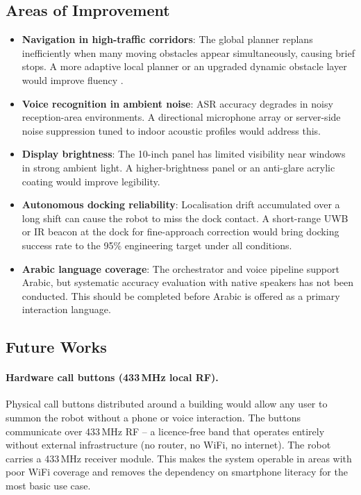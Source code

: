 \subsection{Areas of Improvement}

\begin{itemize}
  \item \textbf{Navigation in high-traffic corridors}: The global planner replans inefficiently when many moving obstacles appear simultaneously, causing brief stops. A more adaptive local planner or an upgraded dynamic obstacle layer would improve fluency \cite{chen2022}.
  \item \textbf{Voice recognition in ambient noise}: ASR accuracy degrades in noisy reception-area environments. A directional microphone array or server-side noise suppression tuned to indoor acoustic profiles would address this.
  \item \textbf{Display brightness}: The 10-inch panel has limited visibility near windows in strong ambient light. A higher-brightness panel or an anti-glare acrylic coating would improve legibility.
  \item \textbf{Autonomous docking reliability}: Localisation drift accumulated over a long shift can cause the robot to miss the dock contact. A short-range UWB or IR beacon at the dock for fine-approach correction would bring docking success rate to the 95\% engineering target under all conditions.
  \item \textbf{Arabic language coverage}: The orchestrator and voice pipeline support Arabic, but systematic accuracy evaluation with native speakers has not been conducted. This should be completed before Arabic is offered as a primary interaction language.
\end{itemize}

\subsection{Future Works}

\paragraph{Hardware call buttons (433\,MHz local RF).}
Physical call buttons distributed around a building would allow any user to summon the robot without a phone or voice interaction. The buttons communicate over 433\,MHz RF -- a licence-free band that operates entirely without external infrastructure (no router, no WiFi, no internet). The robot carries a 433\,MHz receiver module. This makes the system operable in areas with poor WiFi coverage and removes the dependency on smartphone literacy for the most basic use case.

